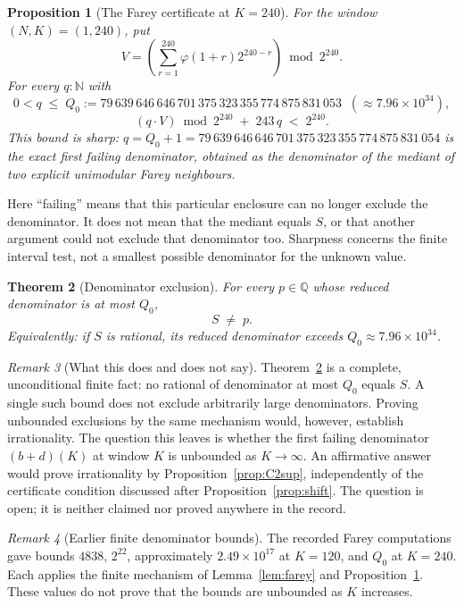 \documentclass[11pt]{article}
\theoremstyle{plain}
\newtheorem{thm}{Theorem}[section]
\newtheorem{prop}[thm]{Proposition}
\theoremstyle{definition}
\theoremstyle{remark}
\newtheorem{rem}[thm]{Remark}
\newcommand{\Q}{\mathbb{Q}}
\begin{document}
\begin{prop}[The Farey certificate at $K=240$]
\label{prop:gapwindow}
For the window $(N,K)=(1,240)$, put
\[
 V=\left(\sum_{r=1}^{240}\varphi(1+r)2^{240-r}\right)\bmod2^{240}.
\]
For every $q : \mathbb{N}$ with
\[
0 < q \;\le\; Q_0 := 79\,639\,646\,646\,701\,375\,323\,355\,774\,875\,831\,053 \;\;(\approx 7.96\times 10^{34}),
\]
\[
(q \cdot V) \bmod 2^{240} \;+\; 243\,q \;<\; 2^{240}.
\]
This bound is \emph{sharp}: $q = Q_0+1 = 79\,639\,646\,646\,701\,375\,323\,355\,774\,875\,831\,054$
is the exact first failing denominator, obtained as the denominator of
the mediant of two explicit unimodular Farey neighbours.
\end{prop}
Here ``failing'' means that this particular enclosure can no longer
exclude the denominator. It does not mean that the mediant equals
$S$, or that another argument could not exclude that denominator too.
Sharpness concerns the finite interval test, not a smallest possible
denominator for the unknown value.

\begin{thm}[Denominator exclusion]
\label{thm:denom-record}
For every $p\in\Q$ whose reduced denominator is at most $Q_0$,
\[
S \;\neq\; p.
\]
Equivalently: \emph{if $S$ is rational, its reduced denominator exceeds}
$Q_0 \approx 7.96 \times 10^{34}$.
\end{thm}

\begin{rem}[What this does and does not say]
Theorem~\ref{thm:denom-record} is a complete, unconditional finite fact: no rational
of denominator at most $Q_0$ equals $S$. A single such bound does not
exclude arbitrarily large denominators. Proving unbounded exclusions by
the same mechanism would, however, establish irrationality. The question
this leaves is whether the first failing denominator $(b+d)(K)$ at
window $K$ is unbounded as $K \to \infty$. An affirmative answer
would prove irrationality by Proposition~\ref{prop:C2sup}, independently of the
certificate condition discussed after Proposition~\ref{prop:shift}. The
question is open; it is neither claimed nor proved anywhere in the record.
\end{rem}

\begin{rem}[Earlier finite denominator bounds]
The recorded Farey computations gave bounds $4838$, $2^{22}$,
approximately $2.49\times10^{17}$ at $K=120$, and $Q_0$ at $K=240$.
Each applies the finite mechanism of Lemma~\ref{lem:farey} and
Proposition~\ref{prop:gapwindow}. These values do not prove that the
bounds are unbounded as $K$ increases.
\end{rem}
\end{document}
